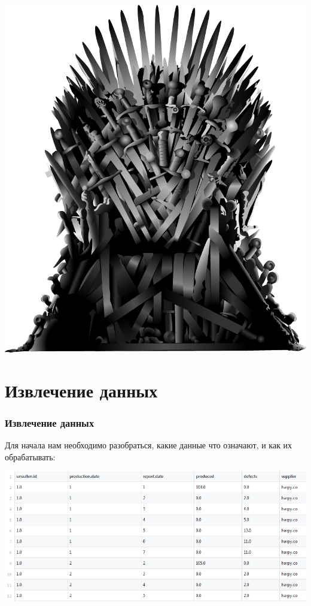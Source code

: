 \documentclass{beamer}
\begin{document}
\begin{frame}
\begin{minipage}{0.3\textwidth}
        \hspace{20pt}
        \includegraphics[scale = 0.07]{iron_throne.png}
    \end{minipage}
       
\end{frame}


\section{Извлечение данных}

\begin{frame}
  \frametitle{Извлечение данных}
    Для начала нам необходимо разобраться, какие данные что означают, и как их обрабатывать: \
    
    \includegraphics[scale = 0.5]{data.PNG}
\end{frame}
\end{document}
